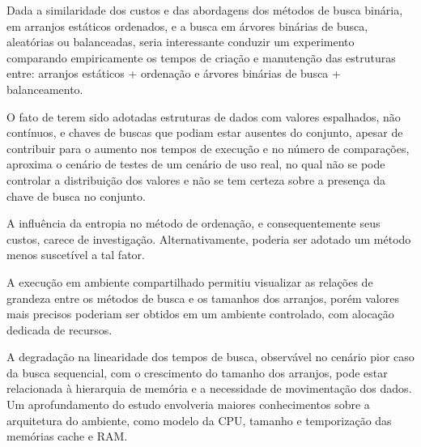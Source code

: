 \documentclass[12pt]{article}
\begin{document}
Dada a similaridade dos custos e das abordagens dos métodos de busca binária, em arranjos estáticos ordenados, e a busca em árvores binárias de busca, aleatórias ou balanceadas, seria interessante conduzir um experimento comparando empiricamente os tempos de criação e manutenção das estruturas entre: arranjos estáticos + ordenação e árvores binárias de busca + balanceamento.

O fato de terem sido adotadas estruturas de dados com valores espalhados, não contínuos, e chaves de buscas que podiam estar ausentes do conjunto, apesar de contribuir para o aumento nos tempos de execução e no número de comparações, aproxima o cenário de testes de um cenário de uso real, no qual não se pode controlar a distribuição dos valores e não se tem certeza sobre a presença da chave de busca no conjunto.

A influência da entropia no método de ordenação, e consequentemente seus custos, carece de investigação. Alternativamente, poderia ser adotado um método menos suscetível a tal fator.

A execução em ambiente compartilhado permitiu visualizar as relações de grandeza entre os métodos de busca e os tamanhos dos arranjos, porém valores mais precisos poderiam ser obtidos em um ambiente controlado, com alocação dedicada de recursos.

A degradação na linearidade dos tempos de busca, observável no cenário pior caso da busca sequencial, com o crescimento do tamanho dos arranjos, pode estar relacionada à hierarquia de memória e a necessidade de movimentação dos dados. Um aprofundamento do estudo envolveria maiores conhecimentos sobre a arquitetura do ambiente, como modelo da CPU, tamanho e temporização das memórias cache e RAM.



\end{document}
